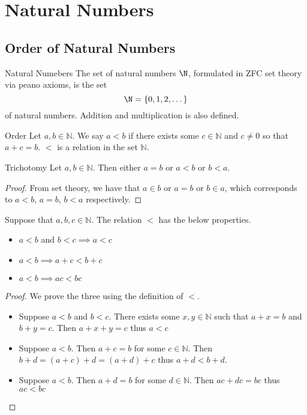 \section{Natural Numbers}
\subsection{Order of Natural Numbers}
\begin{defn}{Natural Numebers}{} The set of natural numbers $\N$, formulated in ZFC set theory via peano axioms, is the set $$\N=\{0,1,2,\dots\}$$ of natural numbers. Addition and multiplication is also defined. 
\end{defn}

\begin{defn}{Order}{} Let $a,b\in\mathbb{N}$. We say $a<b$ if there exists some $c\in\mathbb{N}$ and $c\neq0$ so that $a+c=b$. $<$ is a relation in the set $\mathbb{N}$. 
\end{defn}

\begin{prp}{Trichotomy}{} Let $a,b\in\mathbb{N}$. Then either $a=b$ or $a<b$ or $b<a$. 
\end{prp}
\begin{proof} From set theory, we have that $a\in b$ or $a=b$ or $b\in a$, which corresponds to $a<b$, $a=b$, $b<a$ respectively. 
\end{proof}

\begin{prp}{}{} Suppose that $a,b,c\in\mathbb{N}$. The relation $<$ has the below properties. 
\begin{itemize}
\item $a<b$ and $b<c\implies a<c$
\item $a<b\implies a+c<b+c$
\item $a<b\implies ac<bc$
\end{itemize}
\end{prp}
\begin{proof} We prove the three using the definition of $<$. 
\begin{itemize}
\item Suppose $a<b$ and $b<c$. There exists some $x,y\in\mathbb{N}$ such that $a+x=b$ and $b+y=c$. Then $a+x+y=c$ thus $a<c$
\item Suppose $a<b$. Then $a+c=b$ for some $c\in\mathbb{N}$. Then $b+d=(a+c)+d=(a+d)+c$ thus $a+d<b+d$. 
\item Suppose $a<b$. Then $a+d=b$ for some $d\in\mathbb{N}$. Then $ac+dc=bc$ thus $ac<bc$
\end{itemize}
\end{proof}

